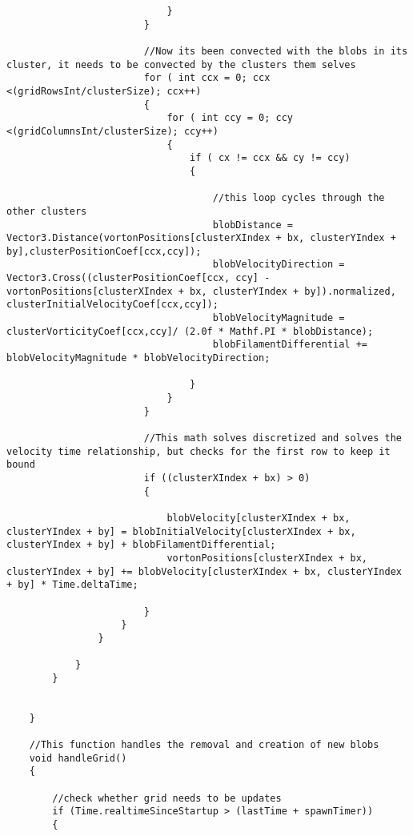 \begin{mdframed}[linecolor=black, topline=true, bottomline=true,
  leftline=false, rightline=false]
\begin{verbatim}
                            }
                        }

                        //Now its been convected with the blobs in its cluster, it needs to be convected by the clusters them selves
                        for ( int ccx = 0; ccx <(gridRowsInt/clusterSize); ccx++)
                        {
                            for ( int ccy = 0; ccy <(gridColumnsInt/clusterSize); ccy++)
                            {
                                if ( cx != ccx && cy != ccy)
                                {

                                    //this loop cycles through the other clusters
                                    blobDistance = Vector3.Distance(vortonPositions[clusterXIndex + bx, clusterYIndex + by],clusterPositionCoef[ccx,ccy]);
                                    blobVelocityDirection = Vector3.Cross((clusterPositionCoef[ccx, ccy] - vortonPositions[clusterXIndex + bx, clusterYIndex + by]).normalized, clusterInitialVelocityCoef[ccx,ccy]);
                                    blobVelocityMagnitude = clusterVorticityCoef[ccx,ccy]/ (2.0f * Mathf.PI * blobDistance);
                                    blobFilamentDifferential += blobVelocityMagnitude * blobVelocityDirection;

                                }
                            }
                        }

                        //This math solves discretized and solves the velocity time relationship, but checks for the first row to keep it bound
                        if ((clusterXIndex + bx) > 0)
                        {

                            blobVelocity[clusterXIndex + bx, clusterYIndex + by] = blobInitialVelocity[clusterXIndex + bx, clusterYIndex + by] + blobFilamentDifferential;
                            vortonPositions[clusterXIndex + bx, clusterYIndex + by] += blobVelocity[clusterXIndex + bx, clusterYIndex + by] * Time.deltaTime;

                        }
                    }
                }

            }
        }


    }

    //This function handles the removal and creation of new blobs
    void handleGrid()
    {

        //check whether grid needs to be updates
        if (Time.realtimeSinceStartup > (lastTime + spawnTimer))
        {


\end{verbatim}
\end{mdframed}
